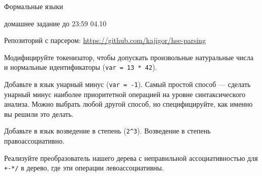 \documentclass[12pt]{article}
\begin{document}
\begin{center} {\LARGE Формальные языки}

 {\Large домашнее задание до 23:59 04.10} \end{center} 
\bigskip

Репозиторий с парсером: \url{https://github.com/kajigor/hse-parsing}

\enumerate
{
  \item 
  {   
    Модифицируйте токенизатор, чтобы допускать произвольные натуральные числа и нормальные идентификаторы (\verb!var = 13 * 42!).
    
  }
  \item
  {
    Добавьте в язык унарный минус (\verb!var = -1!). Самый простой способ --- сделать унарный минус наиболее приоритетной операцией на уровне синтаксического анализа. Можно выбрать любой другой способ, но специфицируйте, как именно вы решили это делать.
  }
  \item
  {
    Добавьте в язык возведение в степень (\verb!2^3!). Возведение в степень правоассоциативно.
  }
  \item
  {
    Реализуйте преобразователь нашего дерева с неправильной ассоциативностью для \verb!+-*/! в дерево, где эти операции левоассоциативны.
  }
}
\end{document}
